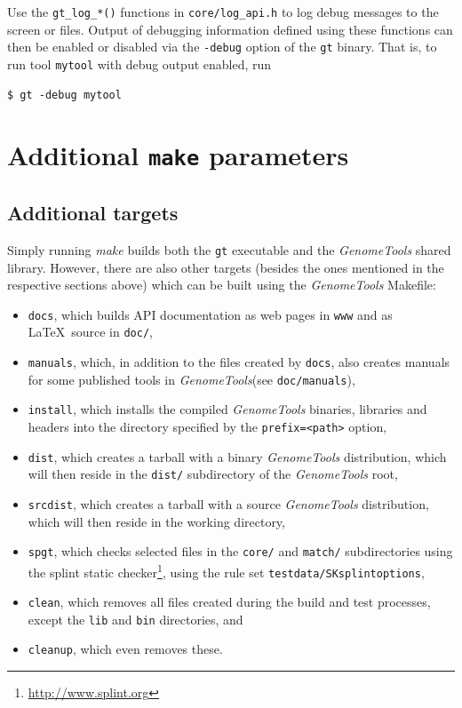 \documentclass[11pt,final]{article}
\newcommand{\keyword}[1]{\lstinline{#1}}
\newcommand{\Gt}[0]{\emph{GenomeTools}\xspace}
\begin{document}
Use the \keyword{gt_log_*()} functions in \keyword{core/log_api.h} to log debug
messages to the screen or files. Output of debugging information defined using
these functions can then be enabled or disabled via the \keyword{-debug} option
of the \keyword{gt} binary. That is, to run tool \keyword{mytool} with debug
output enabled, run

\begin{lstlisting}
$ gt -debug mytool
\end{lstlisting}%

\section{Additional \keyword{make} parameters}

\subsection{Additional targets}
Simply running \emph{make} builds both the \keyword{gt} executable and the
\Gt shared library. However, there are also other targets (besides the ones
mentioned in the respective sections above) which can be built using the \Gt
Makefile:
\begin{itemize}
\item
\keyword{docs}, which builds API documentation as web pages in \keyword{www} and
as \LaTeX\ source in \keyword{doc/},
\item
\keyword{manuals}, which, in addition to the files created by \keyword{docs},
also creates manuals for some published tools in \Gt (see
\keyword{doc/manuals}),
\item
\keyword{install}, which installs the compiled \Gt binaries, libraries and
headers into the directory specified by the \keyword{prefix=<path>} option,
\item
\keyword{dist}, which creates a tarball with a binary \Gt distribution, which
will then reside in the \keyword{dist/} subdirectory of the \Gt root,
\item
\keyword{srcdist}, which creates a tarball with a source \Gt distribution, which
will then reside in the working directory,
\item
\keyword{spgt}, which checks selected files in the \keyword{core/} and
\keyword{match/} subdirectories using the splint static
checker\footnote{\url{http://www.splint.org}}, using the rule set
\keyword{testdata/SKsplintoptions},
\item
\keyword{clean}, which removes all files created during the build and test
processes, except the \keyword{lib} and \keyword{bin} directories, and
\item
\keyword{cleanup}, which even removes these.
\end{itemize}
\end{document}
